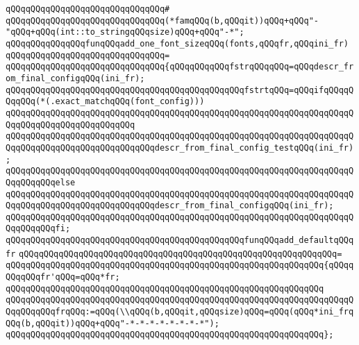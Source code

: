 \verb|qQQqqQQqqQQqqQQqqQQqqQQqqQQqqQQq#|\newline
\verb|qQQqqQQqqQQqqQQqqQQqqQQqqQQqqQQq(*famqQQq(b,qQQqit))qQQq+qQQq"-"qQQq+qQQq(int::to_stringqQQqsize)qQQq+qQQq"-*";|\newline
\newline
\verb|qQQqqQQqqQQqqQQqfunqQQqadd_one_font_sizeqQQq(fonts,qQQqfr,qQQqini_fr)|\newline
\verb|qQQqqQQqqQQqqQQqqQQqqQQqqQQqqQQq=|\newline
\verb|qQQqqQQqqQQqqQQqqQQqqQQqqQQqqQQq{qQQqqQQqqQQqfstrqQQqqQQq=qQQqdescr_from_final_configqQQq(ini_fr);|\newline
\newline
\verb|qQQqqQQqqQQqqQQqqQQqqQQqqQQqqQQqqQQqqQQqqQQqqQQqfstrtqQQq=qQQqifqQQqqQQqqQQq(*(.exact_matchqQQq(font_config)))|\newline
\verb|qQQqqQQqqQQqqQQqqQQqqQQqqQQqqQQqqQQqqQQqqQQqqQQqqQQqqQQqqQQqqQQqqQQqqQQqqQQqqQQqqQQqqQQqqQQqqQQq|\newline
\verb|qQQqqQQqqQQqqQQqqQQqqQQqqQQqqQQqqQQqqQQqqQQqqQQqqQQqqQQqqQQqqQQqqQQqqQQqqQQqqQQqqQQqqQQqqQQqqQQqqQQqdescr_from_final_config_testqQQq(ini_fr);|\newline
\verb|qQQqqQQqqQQqqQQqqQQqqQQqqQQqqQQqqQQqqQQqqQQqqQQqqQQqqQQqqQQqqQQqqQQqqQQqqQQqqQQqelse|\newline
\verb|qQQqqQQqqQQqqQQqqQQqqQQqqQQqqQQqqQQqqQQqqQQqqQQqqQQqqQQqqQQqqQQqqQQqqQQqqQQqqQQqqQQqqQQqqQQqqQQqqQQqdescr_from_final_configqQQq(ini_fr);|\newline
\verb|qQQqqQQqqQQqqQQqqQQqqQQqqQQqqQQqqQQqqQQqqQQqqQQqqQQqqQQqqQQqqQQqqQQqqQQqqQQqqQQqfi;|\newline
\newline
\verb|qQQqqQQqqQQqqQQqqQQqqQQqqQQqqQQqqQQqqQQqqQQqqQQqfunqQQqadd_defaultqQQqfr|\newline
\verb|qQQqqQQqqQQqqQQqqQQqqQQqqQQqqQQqqQQqqQQqqQQqqQQqqQQqqQQqqQQqqQQq=|\newline
\verb|qQQqqQQqqQQqqQQqqQQqqQQqqQQqqQQqqQQqqQQqqQQqqQQqqQQqqQQqqQQqqQQq{qQQqqQQqqQQqfr'qQQq=qQQq*fr;|\newline
\verb|qQQqqQQqqQQqqQQqqQQqqQQqqQQqqQQqqQQqqQQqqQQqqQQqqQQqqQQqqQQqqQQq|\newline
\verb|qQQqqQQqqQQqqQQqqQQqqQQqqQQqqQQqqQQqqQQqqQQqqQQqqQQqqQQqqQQqqQQqqQQqqQQqqQQqqQQqfrqQQq:=qQQq(\\qQQq(b,qQQqit,qQQqsize)qQQq=qQQq(qQQq*ini_frqQQq(b,qQQqit))qQQq+qQQq"-*-*-*-*-*-*-*-*");|\newline
\verb|qQQqqQQqqQQqqQQqqQQqqQQqqQQqqQQqqQQqqQQqqQQqqQQqqQQqqQQqqQQqqQQq};|\newline
